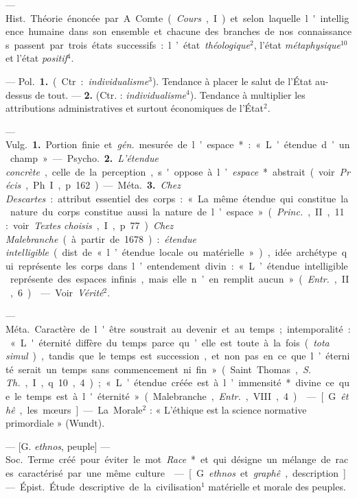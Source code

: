 \begin{itemize}[leftmargin=1cm, label=, itemsep=1pt]
 — \si{Hist.} Théorie
énoncée par A. Comte ({\it Cours}, I) et
selon laquelle l'intelligence humaine
dans son ensemble et chacune des
branches de nos connaissances passent par trois états successifs : l’état
{\it théologique}$^2$, l'état {\it métaphysique}$^{10}$
et l'état {\it positif}$^4$.

 — \si{Pol.} {\bf 1.} (Ctr. : {\it individualisme}$^3$).
Tendance à placer le salut de l'État au-dessus de tout. — {\bf 2.}
(Ctr. : {\it individualisme}$^4$). Tendance à multiplier les attributions
administratives et surtout économiques de l'État$^2$.

 — \si{Vulg.} {\bf 1.} Portion finie et
{\it gén.} mesurée de l’espace* : « L’étendue d’un champ ».

— \si{Psycho.} {\bf 2.} {\it L'étendue concrète},
celle de la perception, s'oppose à
l’{\it espace}* abstrait (voir  {\it Précis}, Ph. I,
p. 162).

— \si{Méta.} {\bf 3.} {\it Chez Descartes} :
attribut essentiel des corps : « La
même étendue qui constitue la nature du corps constitue aussi la
nature de l’espace » ({\it Princ.}, II, 11 :
voir {\it Textes choisis}, I, p. 77). {\it Chez
Malebranche} (à partir de 1678) :
{\it étendue intelligible} (dist. de « l’étendue locale ou matérielle »),
idée archétype qui représente les corps
dans l’entendement divin : « L’étendue intelligible représente des espaces
infinis, mais elle n’en remplit aucun » ({\it Entr.}, II, 6).

 — Voir {\it Vérité}$^2$.

 — \si{Méta.} Caractère de l'être
soustrait au devenir et au temps ;
intemporalité : « L'éternité diffère
du temps parce qu’elle est toute à la
fois ({\it tota simul}), tandis que le temps
est succession, et non pas en ce que
l’éternité serait un temps sans commencement ni fin » (Saint Thomas,
{\it S. Th.}, I, q. 10, 4); « L’étendue créée
est à l’immensité* divine ce que le
temps est à l'éternité » (Malebranche, {\it Entr.}, VIII, 4).

 — [G. {\it êthê}, les mœurs] — La
Morale$^2$ : « L’éthique est la science
normative primordiale » (Wundt).

 — [G. {\it ethnos}, peuple] — \si{Soc.}
Terme créé pour éviter le mot {\it Race}*
et qui désigne un mélange de races
caractérisé par une même culture.

 — [G. {\it ethnos} et {\it graphê},
description] — \si{Épist.} Étude descriptive de la civilisation$^1$ matérielle et morale des peuples.


\end{itemize}
